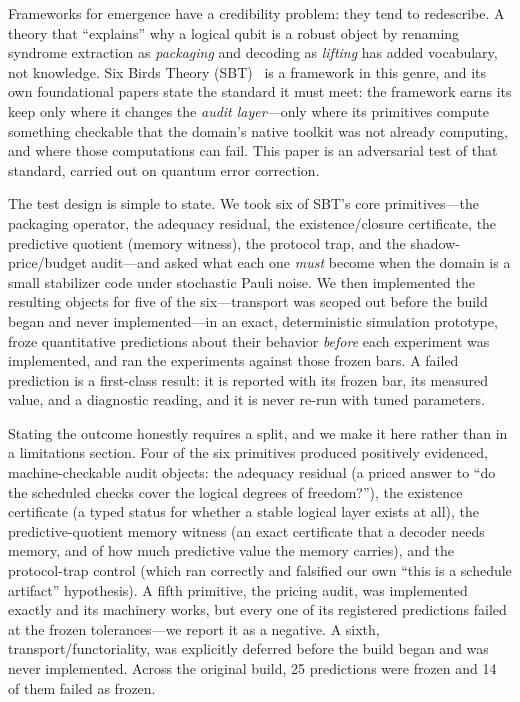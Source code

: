 \documentclass[11pt]{article}
\theoremstyle{definition}
\begin{document}
Frameworks for emergence have a credibility problem: they tend to redescribe. A theory that ``explains'' why a logical qubit is a robust object by renaming syndrome extraction as \emph{packaging} and decoding as \emph{lifting} has added vocabulary, not knowledge. Six Birds Theory (SBT)~\cite{sbt-f1,sbt-f3} is a framework in this genre, and its own foundational papers state the standard it must meet: the framework earns its keep only where it changes the \emph{audit layer}---only where its primitives compute something checkable that the domain's native toolkit was not already computing, and where those computations can fail. This paper is an adversarial test of that standard, carried out on quantum error correction.

The test design is simple to state. We took six of SBT's core primitives---the packaging operator, the adequacy residual, the existence/closure certificate, the predictive quotient (memory witness), the protocol trap, and the shadow-price/budget audit---and asked what each one \emph{must} become when the domain is a small stabilizer code under stochastic Pauli noise. We then implemented the resulting objects for five of the six---transport was scoped out before the build began and never implemented---in an exact, deterministic simulation prototype, froze quantitative predictions about their behavior \emph{before} each experiment was implemented, and ran the experiments against those frozen bars. A failed prediction is a first-class result: it is reported with its frozen bar, its measured value, and a diagnostic reading, and it is never re-run with tuned parameters.

Stating the outcome honestly requires a split, and we make it here rather than in a limitations section. Four of the six primitives produced positively evidenced, machine-checkable audit objects: the adequacy residual (a priced answer to ``do the scheduled checks cover the logical degrees of freedom?''), the existence certificate (a typed status for whether a stable logical layer exists at all), the predictive-quotient memory witness (an exact certificate that a decoder needs memory, and of how much predictive value the memory carries), and the protocol-trap control (which ran correctly and falsified our own ``this is a schedule artifact'' hypothesis). A fifth primitive, the pricing audit, was implemented exactly and its machinery works, but every one of its registered predictions failed at the frozen tolerances---we report it as a negative. A sixth, transport/functoriality, was explicitly deferred before the build began and was never implemented. Across the original build, 25 predictions were frozen and 14 of them failed as frozen. 
\end{document}
